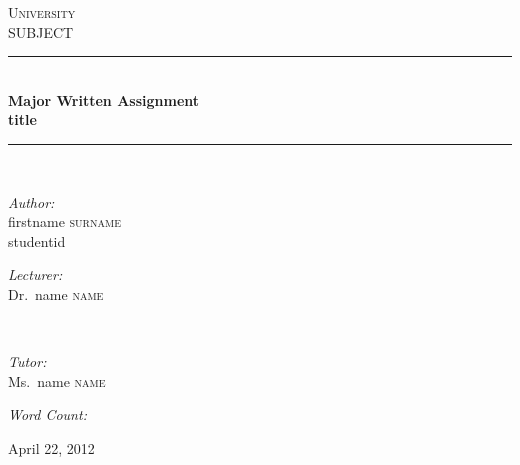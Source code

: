 \begin{titlepage}
\begin{center}
  \textsc{\LARGE University}\\[1.5cm]

  \textsc{\Large SUBJECT}\\[0.5cm]
  \rule{\linewidth}{0.5mm} \\[0.4cm]
  { \huge \bfseries Major Written Assignment\\ \large title}\\[0.4cm]

  \rule{\linewidth}{0.5mm} \\[1.5cm]

  \begin{minipage}{0.4\textwidth}
  \begin{flushleft} \large
  \emph{Author:}\\
  firstname \textsc{surname} \\studentid
  \end{flushleft}
  \end{minipage}
  \begin{minipage}{0.4\textwidth}
  \begin{flushright} \large
  \emph{Lecturer:} \\
  Dr.~name \textsc{name}
  \end{flushright}
  \end{minipage}
  \\[0.4cm] 
  \begin{minipage}{0.4\textwidth}
  \begin{flushleft} \large
  \end{flushleft}
  \end{minipage}
  \begin{minipage}{0.4\textwidth}
  \begin{flushright} \large
  \emph{Tutor:} \\
  Ms.~name \textsc{name}
  \end{flushright}
  \end{minipage}


  \vfill

  {\large \emph{Word Count:} }
  
  {\large April 22, 2012 }

\end{center}
\end{titlepage}
